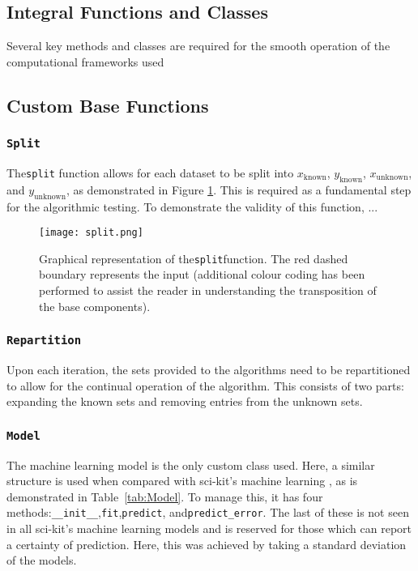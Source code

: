 \subsection{Integral Functions and Classes}
Several key methods and classes are required for the smooth operation of the computational frameworks used

\subsection{Custom Base Functions}
\subsubsection{\lstinline{Split}}
The\lstinline{split} function allows for each dataset to be split into $x_\mathrm{known}$, $y_\mathrm{known}$, $x_\mathrm{unknown}$, and $y_\mathrm{unknown}$, as demonstrated in Figure \ref{fig:Split}. This is required as a fundamental step for the algorithmic testing. To demonstrate the validity of this function, ...

    \begin{figure}[H]
        \begin{center}
            \texttt{[image: split.png]}
        \end{center}
        \caption[Representation of the split function]{Graphical representation of the\lstinline{split}function. The red dashed boundary represents the input (additional colour coding has been performed to assist the reader in understanding the transposition of the base components).}
        \label{fig:Split}
    \end{figure}


    \subsubsection{\lstinline{Repartition}}
    Upon each iteration, the sets provided to the algorithms need to be repartitioned to allow for the continual operation of the algorithm. This consists of two parts: expanding the known sets and removing entries from the unknown sets.

    \subsubsection{\lstinline{Model}}
    The machine learning model is the only custom class used. Here, a similar structure is used when compared with sci-kit's machine learning \cite{scikit}, as is demonstrated in Table~\ref{tab:Model}. To manage this, it has four methods:\lstinline{__init__},\lstinline{fit},\lstinline{predict}, and\lstinline{predict_error}. The last of these is not seen in all sci-kit's machine learning models and is reserved for those which can report a certainty of prediction. Here, this was achieved by taking a standard deviation of the models.

